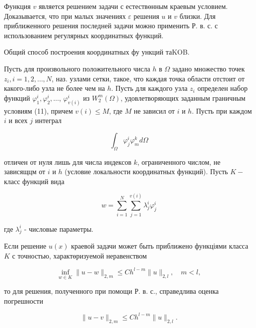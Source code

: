 \documentclass[10pt]{article}
\begin{document}
Функция $v$ является решением задачи с естествөнным краевым условием. Доказывается, что при малых значениях $\varepsilon$ решения $u$ и $v$ близки. Для приближенного решения последней задачи можно применить Р. в. с. с использованием регулярных координатных функций.



Общий способ построения координатных фу ункций таKOB.



Пусть для произвольного положительного числа $h$ в $\Omega$ задано множество точек $z_{i}, i=1,2, \ldots, N$, наз. узлами сетки, такое, что каждая точка области отстоит от какого-либо узла не более чем на $h$. Пусть для каждого узла $z_{i}$ определен набор функций $\varphi_{1}^{i}, \varphi_{2}^{i}, \ldots$, $\varphi_{v(i)}^{i}$ из $W_{2}^{m}(\Omega)$, удовлетворяющих заданным граничным условиям (11), причем $v(i) \leqslant M$, где $M$ не зависил от $i$ и $h$. Пусть при каждом $i$ и всех $j$ интеграл



\[

\int_{\Omega} \varphi_{j}^{i} \varphi_{m}^{k} d \Omega

\]



отличен от нуля лишь для числа индексов $k$, ограниченного числом, не зависящцм от $i$ и $h$ (условие локальности координатных функций). Пусть $K-$ класс функций вида



\[

w=\sum_{i=1}^{N} \sum_{j=1}^{v(i)} \lambda_{j}^{i} \varphi_{j}^{i}

\]



где $\lambda_{j}^{i}$ - числовые параметры.



Если решение $u(x)$ краевой задачи может быть приближено функціями класса $K$ с точностью, характөризуемой неравенством



\[

\inf _{w \in K}\|u-w\|_{2, m} \leqslant C h^{l-m}\|u\|_{2, l}, \quad m<l,

\]



то для решения, полученного при помощи Р. в. с., справедлива оценка погрешности



\[

\|u-v\|_{2, m} \leqslant C h^{l-m}\|u\|_{2, l} .

\]
\end{document}
